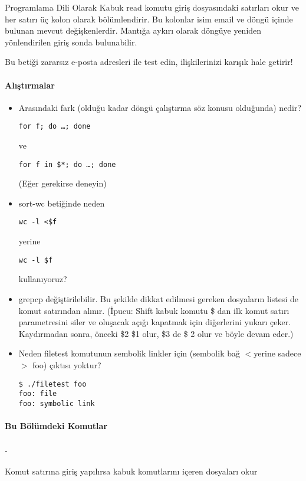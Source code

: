 \begin{section}{Programlama Dili Olarak Kabuk}
read komutu giriş dosyasındaki satırları okur ve her satırı üç kolon olarak bölümlendirir. Bu kolonlar isim email ve döngü içinde bulunan mevcut değişkenlerdir. Mantığa aykırı olarak döngüye yeniden yönlendirilen giriş sonda bulunabilir. 

Bu betiği zararsız e-posta adresleri ile test edin, ilişkilerinizi karışık hale getirir!

\paragraph{Alıştırmalar}{
\begin{itemize}
\item Arasındaki fark (olduğu kadar döngü çalıştırma söz konusu olduğunda) nedir?
\begin{verbatim}
for f; do …; done
\end{verbatim}
ve
\begin{verbatim}
for f in $*; do …; done
\end{verbatim}
(Eğer gerekirse deneyin)
\item sort-wc betiğinde neden
\begin{verbatim}
wc -l <$f
\end{verbatim}
yerine
\begin{verbatim}
wc -l $f
\end{verbatim}
kullanıyoruz?
\item grepcp değiştirilebilir. Bu şekilde dikkat edilmesi gereken dosyaların listesi de komut satırından alınır. (İpucu: Shift kabuk komutu \$ dan ilk komut satırı parametresini siler ve oluşacak açığı kapatmak için diğerlerini yukarı çeker. Kaydırmadan sonra, önceki \$2 \$1 olur, \$3 de \$ 2 olur ve böyle devam eder.)
\item Neden filetest komutunun sembolik linkler için (sembolik bağ $<$yerine sadece$>$ foo) çıktısı yoktur?
\begin{verbatim}
$ ./filetest foo
foo: file
foo: symbolic link
\end{verbatim}
\end{itemize}
}
\end{section}
\paragraph{Bu Bölümdeki Komutlar}{}
\paragraph{.}{Komut satırına giriş yapılırsa kabuk komutlarını içeren dosyaları okur}

